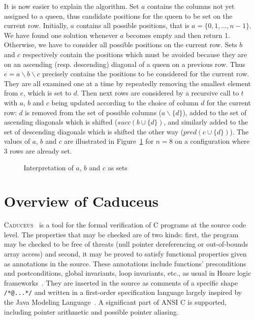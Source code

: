 \documentclass[a4paper]{llncs}
\newcommand{\caduceus}{\textsc{Caduceus}}
\begin{document}
It is now easier to explain the algorithm. Set $a$ contains the
columns not yet assigned to a queen, thus candidate positions
for the queen to be set on the current row. Initially, $a$ contains
all possible positions, that is  $a = \{0,1,\dots,n-1\}$. 
We have found one solution whenever $a$ becomes empty and then return 1.
Otherwise, we have to consider all possible positions on the current
row. Sets $b$ and $c$ respectively contain the positions which
must be avoided because they are on an ascending (resp. descending)
diagonal of a queen on a previous row.
Thus $e = a\backslash b\backslash c$ precisely contains the positions to be
considered for the current row. They are all examined one at a time by
repeatedly removing the smallest element from $e$, which is set to $d$.
Then next rows are considered by a recursive call to $t$ with $a$,
$b$ and $c$ being updated according to the choice of column $d$
for the current row: $d$ is removed from the set of possible columns
($a\backslash\{d\}$), added to the set of ascending diagonals which is
shifted ($\mathit{succ}(b\cup\{d\})$, and similarly  added to the set of
descending diagonals which is shifted the other way
($\mathit{pred}(c\cup\{d\})$). 
The values of $a$, $b$ and $c$ are illustrated in Figure~\ref{fig:abc}
for $n=8$ on a configuration where 3 rows are already set.

\begin{figure}[t]
  \hspace*{-3em}
  \caption{Interpretation of $a$, $b$ and $c$ as sets}
  \label{fig:abc}
\end{figure}

\section{Overview of Caduceus}\label{caduceus}

\caduceus~\cite{caduceus,FilliatreMarche04} is a tool for the
formal verification of C programs at the source code level.
The properties that may be checked are of two kinds: first, the
program may be checked to be free of threats (null pointer
dereferencing or out-of-bounds array access) and second, it may be
proved to satisfy functional properties given as annotations in the
source. These annotations include functions' preconditions and
postconditions, global invariants, loop invariants, etc., as usual in
Hoare logic frameworks~\cite{Hoare69}.
They are inserted in the source as comments of
a specific shape \texttt{/*@...*/} and written in a first-order specification
language largely inspired by the Java Modeling Language~\cite{JML}.
A significant part of ANSI C is supported, including pointer
arithmetic and possible pointer aliasing.
\end{document}
